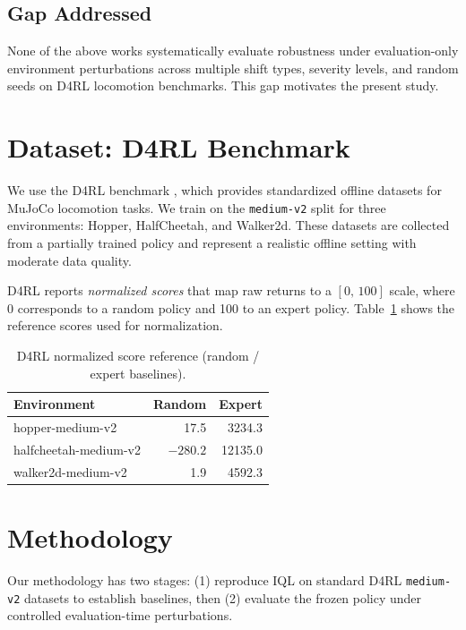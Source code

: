 \documentclass[conference]{IEEEtran}
\begin{document}
\subsection{Gap Addressed}

None of the above works systematically evaluate robustness under
evaluation-only environment perturbations across multiple shift types,
severity levels, and random seeds on D4RL locomotion benchmarks. This gap
motivates the present study.

\section{Dataset: D4RL Benchmark}
\label{sec:dataset}

We use the D4RL benchmark \cite{fu2020d4rl}, which provides standardized
offline datasets for MuJoCo locomotion tasks. We train on the
\texttt{medium-v2} split for three environments: Hopper, HalfCheetah, and
Walker2d. These datasets are collected from a partially trained policy and
represent a realistic offline setting with moderate data quality.

D4RL reports \emph{normalized scores} that map raw returns to a $[0,\,100]$
scale, where 0 corresponds to a random policy and 100 to an expert policy.
Table~\ref{tab:norm} shows the reference scores used for normalization.

\begin{table}[t]
  \centering
  \caption{D4RL normalized score reference (random / expert baselines).}
  \label{tab:norm}
  \begin{tabular}{lrr}
    \toprule
    Environment & Random & Expert \\
    \midrule
    hopper-medium-v2      & 17.5    & 3234.3  \\
    halfcheetah-medium-v2 & $-280.2$ & 12135.0 \\
    walker2d-medium-v2    & 1.9     & 4592.3  \\
    \bottomrule
  \end{tabular}
\end{table}

\section{Methodology}
\label{sec:method}

Our methodology has two stages: (1) reproduce IQL on standard D4RL
\texttt{medium-v2} datasets to establish baselines, then (2) evaluate the
frozen policy under controlled evaluation-time perturbations.
\end{document}
